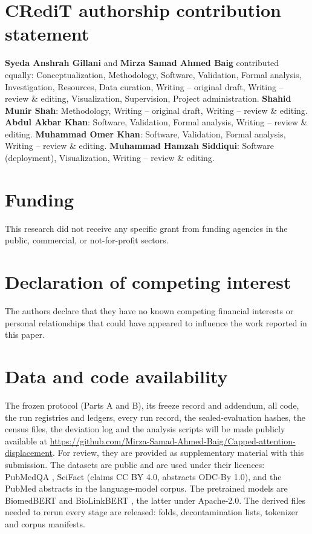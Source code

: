 \documentclass[preprint,12pt,authoryear]{elsarticle}
\begin{document}
\section*{CRediT authorship contribution statement}
\textbf{Syeda Anshrah Gillani} and \textbf{Mirza Samad Ahmed Baig} contributed equally: Conceptualization, Methodology,
Software, Validation, Formal analysis, Investigation, Resources, Data curation, Writing -- original draft, Writing --
review \& editing, Visualization, Supervision, Project administration.
\textbf{Shahid Munir Shah}: Methodology, Writing -- original draft, Writing -- review \& editing.
\textbf{Abdul Akbar Khan}: Software, Validation, Formal analysis, Writing -- review \& editing.
\textbf{Muhammad Omer Khan}: Software, Validation, Formal analysis, Writing -- review \& editing.
\textbf{Muhammad Hamzah Siddiqui}: Software (deployment), Visualization, Writing -- review \& editing.

\section*{Funding}
This research did not receive any specific grant from funding agencies in the public, commercial, or not-for-profit
sectors.

\section*{Declaration of competing interest}
The authors declare that they have no known competing financial interests or personal relationships that could have
appeared to influence the work reported in this paper.

\section*{Data and code availability}
The frozen protocol (Parts A and B), its freeze record and addendum, all code, the run registries and ledgers,
every run record, the sealed-evaluation hashes, the census files, the deviation log and the analysis scripts
will be made publicly available at
\url{https://github.com/Mirza-Samad-Ahmed-Baig/Capped-attention-displacement}. For review, they are provided
as supplementary material with this submission. The datasets are public and are used under their licences:
PubMedQA \citep{jin2019pubmedqa}, SciFact \citep{wadden2020scifact} (claims CC BY 4.0, abstracts ODC-By 1.0), and
the PubMed abstracts in the language-model corpus. The pretrained models are BiomedBERT \citep{gu2021domain} and
BioLinkBERT \citep{yasunaga2022linkbert}, the latter under Apache-2.0. The derived files needed to rerun every stage are
released: folds, decontamination lists, tokenizer and corpus manifests.
\end{document}
